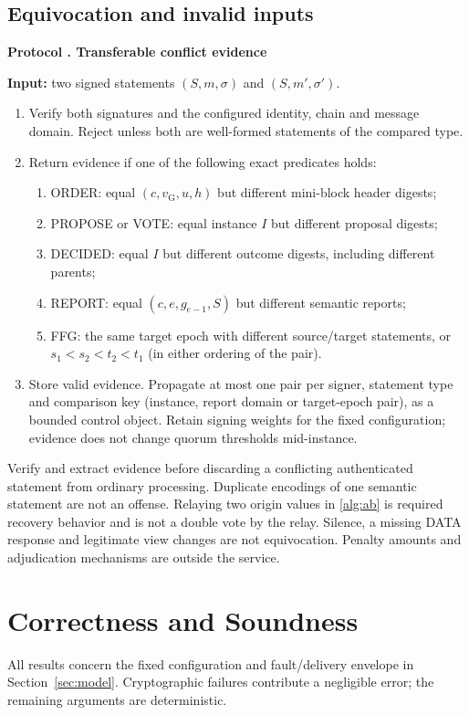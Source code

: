 \documentclass[11pt,a4paper,onecolumn]{article}
\newcommand{\gv}{v_{\mathrm G}}
\theoremstyle{remark}\newtheorem{example}[definition]{Example}
\newcounter{protocol}
\newenvironment{protocol}[2]{\refstepcounter{protocol}\label{#1}\begin{mdframed}[nobreak=true,linewidth=.6pt,skipabove=10pt,skipbelow=10pt,innertopmargin=8pt,innerbottommargin=8pt]\small\raggedright\noindent\textbf{Protocol \theprotocol. #2}\par\smallskip}{\end{mdframed}}
\begin{document}
\subsection{Equivocation and invalid inputs}\label{sec:evidence}
\begin{protocol}{alg:evidence}{Transferable conflict evidence}
\textbf{Input:} two signed statements $(S,m,\sigma)$ and $(S,m',\sigma')$.
\begin{enumerate}[label=\textbf{E\arabic*.}]
\item Verify both signatures and the configured identity, chain and message
domain. Reject unless both are well-formed statements of the compared type.
\item Return evidence if one of the following exact predicates holds:
\begin{enumerate}[label=\textnormal{(\alph*)}]
\item ORDER: equal $(c,\gv,u,h)$ but different mini-block header digests;
\item PROPOSE or VOTE: equal instance $I$ but different proposal digests;
\item DECIDED: equal $I$ but different outcome digests, including different parents;
\item REPORT: equal $(c,e,g_{e-1},S)$ but different semantic reports;
\item FFG: the same target epoch with different source/target statements, or
$s_1<s_2<t_2<t_1$ (in either ordering of the pair).
\end{enumerate}
\item Store valid evidence. Propagate at most one pair per signer, statement
type and comparison key (instance, report domain or target-epoch pair), as a bounded
control object. Retain
signing weights for the fixed configuration; evidence does not change quorum
thresholds mid-instance.
\end{enumerate}
\end{protocol}

Verify and extract evidence before discarding a conflicting authenticated
statement from ordinary processing. Duplicate encodings of one semantic
statement are not an offense. Relaying two origin values in \cref{alg:ab} is
required recovery behavior and is not a double vote by the relay. Silence,
a missing DATA response and legitimate view changes are not equivocation. Penalty amounts and adjudication mechanisms are outside
the service.

\section{Correctness and Soundness}\label{sec:proofs}
All results concern the fixed configuration and fault/delivery envelope in
Section~\ref{sec:model}. Cryptographic failures contribute a negligible error;
the remaining arguments are deterministic.
\end{document}
